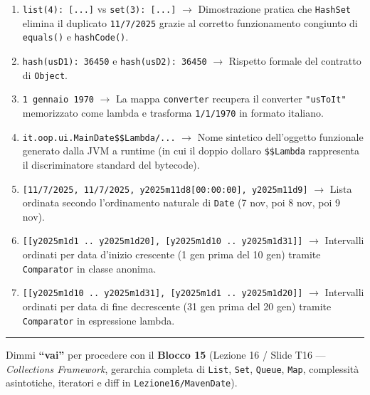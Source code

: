\documentclass[11pt,a4paper,oneside]{report}
\newcommand{\passthrough}[1]{#1}
\providecommand{\tightlist}{\setlength{\itemsep}{0pt}\setlength{\parskip}{0pt}}
\begin{document}
\begin{enumerate}
\def\labelenumi{\arabic{enumi}.}
\tightlist
\item
  \passthrough{\lstinline!list(4): [...]!} vs
  \passthrough{\lstinline!set(3): [...]!} \(\rightarrow\) Dimostrazione
  pratica che \passthrough{\lstinline!HashSet!} elimina il duplicato
  \passthrough{\lstinline!11/7/2025!} grazie al corretto funzionamento
  congiunto di \passthrough{\lstinline!equals()!} e
  \passthrough{\lstinline!hashCode()!}.
\item
  \passthrough{\lstinline!hash(usD1): 36450!} e
  \passthrough{\lstinline!hash(usD2): 36450!} \(\rightarrow\) Rispetto
  formale del contratto di \passthrough{\lstinline!Object!}.
\item
  \passthrough{\lstinline!1 gennaio 1970!} \(\rightarrow\) La mappa
  \passthrough{\lstinline!converter!} recupera il converter
  \passthrough{\lstinline!"usToIt"!} memorizzato come lambda e trasforma
  \passthrough{\lstinline!1/1/1970!} in formato italiano.
\item
  \passthrough{\lstinline!it.oop.ui.MainDate$$Lambda/...!}
  \(\rightarrow\) Nome sintetico dell'oggetto funzionale generato dalla
  JVM a runtime (in cui il doppio dollaro
  \passthrough{\lstinline!$$Lambda!} rappresenta il discriminatore
  standard del bytecode).
\item
  \passthrough{\lstinline![11/7/2025, 11/7/2025, y2025m11d8[00:00:00], y2025m11d9]!}
  \(\rightarrow\) Lista ordinata secondo l'ordinamento naturale di
  \passthrough{\lstinline!Date!} (7 nov, poi 8 nov, poi 9 nov).
\item
  \passthrough{\lstinline![[y2025m1d1 .. y2025m1d20], [y2025m1d10 .. y2025m1d31]]!}
  \(\rightarrow\) Intervalli ordinati per data d'inizio crescente (1 gen
  prima del 10 gen) tramite \passthrough{\lstinline!Comparator!} in
  classe anonima.
\item
  \passthrough{\lstinline![[y2025m1d10 .. y2025m1d31], [y2025m1d1 .. y2025m1d20]]!}
  \(\rightarrow\) Intervalli ordinati per data di fine decrescente (31
  gen prima del 20 gen) tramite \passthrough{\lstinline!Comparator!} in
  espressione lambda.
\end{enumerate}

\begin{center}\rule{0.5\linewidth}{0.5pt}\end{center}

Dimmi \textbf{``vai''} per procedere con il \textbf{Blocco 15} (Lezione
16 / Slide T16 --- \emph{Collections Framework}, gerarchia completa di
\passthrough{\lstinline!List!}, \passthrough{\lstinline!Set!},
\passthrough{\lstinline!Queue!}, \passthrough{\lstinline!Map!},
complessità asintotiche, iteratori e diff in
\passthrough{\lstinline!Lezione16/MavenDate!}).
\end{document}
